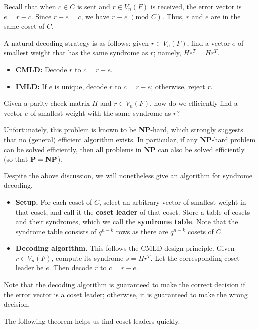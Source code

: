 \documentclass[10pt]{article}
\theoremstyle{newstyle}
\begin{document}
Recall that when $c \in C$ is sent and $r \in V_n(F)$ is received, the error vector is $e = r-c$. 
Since $r - e = c$, we have $r \equiv e \; (\text{mod } C)$. Thus, $r$ and $e$ are in the same coset of $C$.

A natural decoding strategy is as follows: given $r \in V_n(F)$, find a vector $e$ of smallest 
weight that has the same syndrome as $r$; namely, $He^T = Hr^T$. 
\begin{itemize}
    \item {\bf CMLD:} Decode $r$ to $c = r-e$. 
    \item {\bf IMLD:} If $e$ is unique, decode $r$ to $c = r-e$; otherwise, reject $r$. 
\end{itemize}
Given a parity-check matrix $H$ and $r \in V_n(F)$, how do we efficiently find a vector $e$ 
of smallest weight with the same syndrome as $r$?

Unfortunately, this problem is known to be {\bf NP}-hard, which strongly suggests that no 
(general) efficient algorithm exists. In particular, if any {\bf NP}-hard problem can be solved 
efficiently, then all problems in {\bf NP} can also be solved efficiently (so that 
${\text{\bf P}} = {\text{\bf NP}}$).

Despite the above discussion, we will nonetheless give an algorithm for syndrome decoding. 
\begin{itemize}

\item {\bf Setup.} For each coset of $C$, select an arbitrary vector of smallest weight in that coset, 
and call it the {\bf coset leader} of that coset. Store a table of cosets and their syndromes, 
which we call the {\bf syndrome table}. Note that the syndrome table consists of 
$q^{n-k}$ rows as there are $q^{n-k}$ cosets of $C$. 

\item {\bf Decoding algorithm.} This follows the CMLD design principle. Given $r \in V_n(F)$, compute 
its syndrome $s = Hr^T$. Let the corresponding coset leader be $e$. Then decode $r$ to $c = r-e$. 

\end{itemize}

Note that the decoding algorithm is guaranteed to make the correct decision if the error vector 
is a coset leader; otherwise, it is guaranteed to make the wrong decision. 

The following theorem helps us find coset leaders quickly. 
\end{document}

